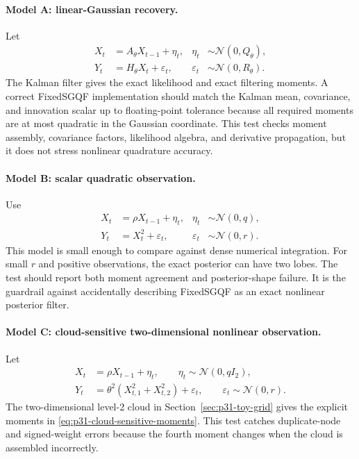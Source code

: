 \documentclass[11pt]{article}
\numberwithin{equation}{section}
\newcommand{\N}{\mathcal N}
\begin{document}
\paragraph{Model A: linear-Gaussian recovery.}
Let
\begin{align}
  X_t &= A_\theta X_{t-1}+\eta_t,
  &
  \eta_t&\sim\N(0,Q_\theta),
  \label{eq:p32-test-lg-state}\\
  Y_t &= H_\theta X_t+\varepsilon_t,
  &
  \varepsilon_t&\sim\N(0,R_\theta).
  \label{eq:p32-test-lg-obs}
\end{align}
The Kalman filter gives the exact likelihood and exact filtering moments.  A
correct FixedSGQF implementation should match the Kalman mean, covariance, and
innovation scalar up to floating-point tolerance because all required moments
are at most quadratic in the Gaussian coordinate.  This test checks moment
assembly, covariance factors, likelihood algebra, and derivative propagation,
but it does not stress nonlinear quadrature accuracy.

\paragraph{Model B: scalar quadratic observation.}
Use
\begin{align}
  X_t &= \rho X_{t-1}+\eta_t,
  &
  \eta_t&\sim\N(0,q),
  \label{eq:p32-test-quad-state}\\
  Y_t &= X_t^2+\varepsilon_t,
  &
  \varepsilon_t&\sim\N(0,r).
  \label{eq:p32-test-quad-obs}
\end{align}
This model is small enough to compare against dense numerical integration.
For small \(r\) and positive observations, the exact posterior can have two
lobes.  The test should report both moment agreement and posterior-shape
failure.  It is the guardrail against accidentally describing FixedSGQF as an
exact nonlinear posterior filter.

\paragraph{Model C: cloud-sensitive two-dimensional nonlinear observation.}
Let
\begin{align}
  X_t&=\rho X_{t-1}+\eta_t,\qquad
  \eta_t\sim\N(0,qI_2),
  \label{eq:p32-test-cloud-state}\\
  Y_t&=\theta^2(X_{t,1}^2+X_{t,2}^2)+\varepsilon_t,\qquad
  \varepsilon_t\sim\N(0,r).
  \label{eq:p32-test-cloud-obs}
\end{align}
The two-dimensional level-2 cloud in Section~\ref{sec:p31-toy-grid} gives the
explicit moments in \eqref{eq:p31-cloud-sensitive-moments}.  This test catches
duplicate-node and signed-weight errors because the fourth moment changes when
the cloud is assembled incorrectly.
\end{document}

